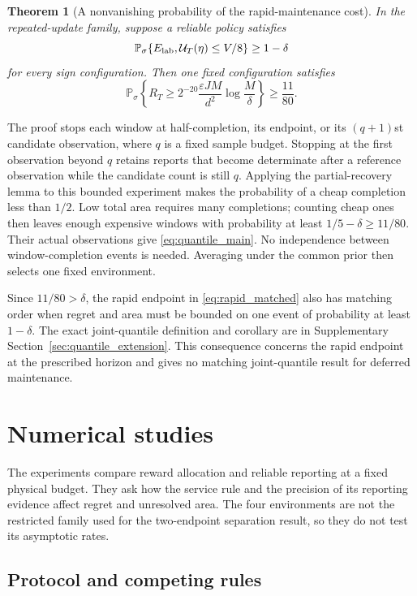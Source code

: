 \documentclass[11pt]{article}
\newtheorem{theorem}{Theorem}[section]
\theoremstyle{remark}
\newcommand{\Prob}{\mathbb P}
\begin{document}
\begin{theorem}[A nonvanishing probability of the rapid-maintenance cost]
\label{thm:quantile_main}
In the repeated-update family, suppose a reliable policy satisfies
\[
 \Prob_\sigma\{E_{\rm lab},\mathcal U_T(\eta)\le V/8\}\ge1-\delta
\]
for every sign configuration. Then one fixed configuration satisfies
\begin{equation}
 \Prob_\sigma\left\{R_T\ge
 2^{-20}\frac{\varepsilon JM}{d^2}\log\frac M\delta\right\}
 \ge\frac{11}{80}.
 \label{eq:quantile_main}
\end{equation}
\end{theorem}

The proof stops each window at half-completion, its endpoint, or its
$(q+1)$st candidate observation, where $q$ is a fixed sample budget. Stopping
at the first observation beyond $q$ retains reports that become determinate
after a reference observation while the candidate count is still $q$.
Applying the partial-recovery lemma to this bounded experiment makes the
probability of a cheap completion less than $1/2$. Low total area requires
many completions; counting cheap ones then leaves enough expensive windows
with probability at least $1/5-\delta\ge11/80$. Their actual observations
give \eqref{eq:quantile_main}. No independence between window-completion
events is needed. Averaging under the common prior then selects one fixed
environment.

Since $11/80>\delta$, the rapid endpoint in \eqref{eq:rapid_matched} also
has matching order when regret and area must be bounded on one event of
probability at least $1-\delta$. The exact joint-quantile definition and
corollary are in Supplementary Section~\ref{sec:quantile_extension}. This
consequence concerns the rapid endpoint at the prescribed horizon and gives
no matching joint-quantile result for deferred maintenance.

\section{Numerical studies}
\label{sec:experiments}

The experiments compare reward allocation and reliable reporting at a fixed
physical budget. They ask how the service rule and the precision of its
reporting evidence affect regret and unresolved area. The four environments
are not the restricted family used for the two-endpoint separation result,
so they do not test its asymptotic rates.

\subsection{Protocol and competing rules}
\end{document}
